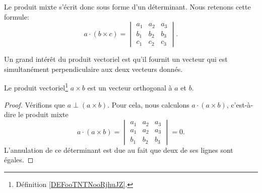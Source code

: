 Le produit mixte s'écrit donc sous forme d'un déterminant. Nous retenons cette formule:
\begin{equation}        \label{EqProduitMixteDet}
    a\cdot (b\times c)=\begin{vmatrix}
        a_1    &   a_2    &   a_3    \\
        b_1    &   b_2    &   b_3    \\
        c_1    &   c_2    &   c_3
    \end{vmatrix}.
\end{equation}

Un grand intérêt du produit vectoriel est qu'il fournit un vecteur qui est simultanément perpendiculaire aux deux vecteurs donnés.
\begin{proposition}     \label{PROPooTUVKooOQXKKl}
    Le produit vectoriel\footnote{Définition \ref{DEFooTNTNooRjhuJZ}.} $a\times b$ est un vecteur orthogonal à $a$ et $b$.
\end{proposition}

\begin{proof}
    Vérifions que $a\perp (a\times b)$. Pour cela, nous calculons $a\cdot (a\times b)$, c'est-à-dire le produit mixte
    \begin{equation}
        a\cdot(a\times b)=\begin{vmatrix}
            a_1    &   a_2    &   a_3    \\
            a_1    &   a_2    &   a_3    \\
            b_1    &   b_2    &   b_3
        \end{vmatrix}=0.
    \end{equation}
    L'annulation de ce déterminant est due au fait que deux de ses lignes sont égales.
\end{proof}

